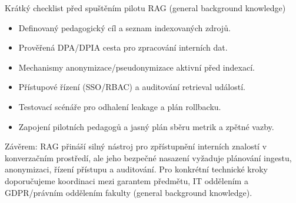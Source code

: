 Krátký checklist před spuštěním pilotu RAG (general background knowledge)
\begin{itemize}
  \item Definovaný pedagogický cíl a seznam indexovaných zdrojů.
  \item Prověřená DPA/DPIA cesta pro zpracování interních dat.
  \item Mechanismy anonymizace/pseudonymizace aktivní před indexací.
  \item Přístupové řízení (SSO/RBAC) a auditování retrieval událostí.
  \item Testovací scénáře pro odhalení leakage a plán rollbacku.
  \item Zapojení pilotních pedagogů a jasný plán sběru metrik a zpětné vazby.
\end{itemize}

Závěrem: RAG přináší silný nástroj pro zpřístupnění interních znalostí v konverzačním prostředí, ale jeho bezpečné nasazení vyžaduje plánování ingestu, anonymizaci, řízení přístupu a auditování. Pro konkrétní technické kroky doporučujeme koordinaci mezi garantem předmětu, IT oddělením a GDPR/právním oddělením fakulty (general background knowledge).